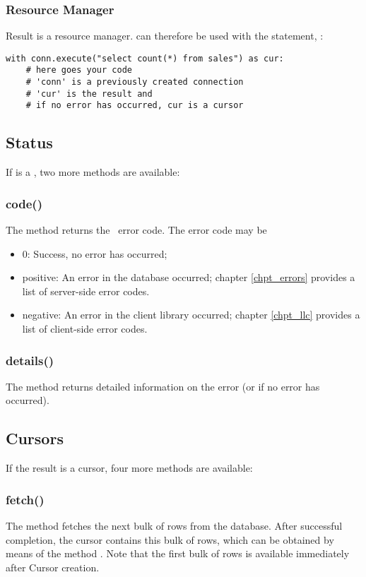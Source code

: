 \subsubsection{Resource Manager}
Result is a resource manager.
 can therefore
be used with the  statement, \eg:

\begin{python}
\begin{lstlisting}
with conn.execute("select count(*) from sales") as cur:
    # here goes your code
    # 'conn' is a previously created connection
    # 'cur' is the result and
    # if no error has occurred, cur is a cursor
\end{lstlisting}
\end{python}

\subsection{Status}
If  is a ,
two more methods are available:

\subsubsection{code()}
The method returns the \nowdb\ error code.
The error code may be
\begin{itemize}
\item 0: Success, no error has occurred;
\item positive:
An error in the database occurred;
chapter \ref{chpt_errors} provides a list
of server-side error codes.
\item negative:
An error in the client library occurred;
chapter \ref{chpt_llc} provides a list
of client-side error codes.
\end{itemize}

\subsubsection{details()}
The method returns
detailed information on the error
(or  if no error has occurred).

\subsection{Cursors}
If the result is a cursor,
four more methods are available:

\subsubsection{fetch()}
The method fetches the next bulk
of rows from the database.
After successful completion,
the cursor contains this bulk
of rows, which can be obtained by means of
the method .
Note that the first bulk of rows
is available immediately after
Cursor creation.

